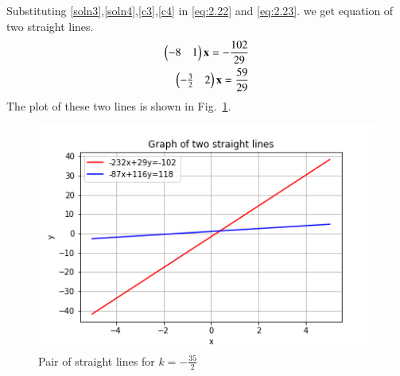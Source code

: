 \documentclass[journal,12pt,twocolumn]{IEEEtran}
\begin{document}
Substituting \eqref{soln3},\eqref{soln4},\eqref{c3},\eqref{c4} in \eqref{eq:2.22} and \eqref{eq:2.23}. we get equation of two straight lines.
\begin{align}
    \begin{pmatrix}-8 & 1\end{pmatrix}\mathbf{x}=-\frac{102}{29}\\
    \begin{pmatrix}-\frac{3}{2} & 2\end{pmatrix}\mathbf{x}=\frac{59}{29}
\end{align}
\newpage
The plot of these two lines is shown in Fig.~\ref{fig:figure2}.
\renewcommand{\thefigure}{2}
\begin{figure}[ht!]
    \centering
    \includegraphics[width=\columnwidth]{Figure2}
    \caption{Pair of straight lines for $k=-\frac{35}{2}$}
    \label{fig:figure2}
\end{figure}
\end{document}
